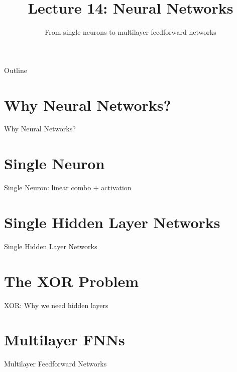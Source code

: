 \documentclass[aspectratio=169]{beamer}
\title{Lecture 14: Neural Networks}
\subtitle{From single neurons to multilayer feedforward networks}
\date{}
\begin{document}
\begin{frame}\titlepage\end{frame}

\begin{frame}{Outline}
  \tableofcontents
\end{frame}

\section{Why Neural Networks?}
\begin{frame}{Why Neural Networks?}
\end{frame}

\section{Single Neuron}
\begin{frame}{Single Neuron: linear combo + activation}
\end{frame}

\section{Single Hidden Layer Networks}
\begin{frame}{Single Hidden Layer Networks}
\end{frame}

\section{The XOR Problem}
\begin{frame}{XOR: Why we need hidden layers}
\end{frame}

\section{Multilayer FNNs}
\begin{frame}{Multilayer Feedforward Networks}
\end{frame}
\end{document}
